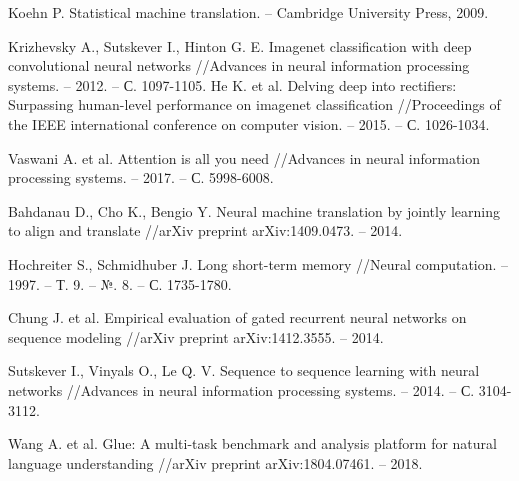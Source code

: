 \begingroup 
\renewcommand{\section}[2]{\anonsection{Список используемых источников}}
\begin{thebibliography}{00}

    Koehn P. Statistical machine translation. – Cambridge University Press, 2009.
    
    Krizhevsky A., Sutskever I., Hinton G. E. Imagenet classification with deep convolutional neural networks //Advances in neural information processing systems. – 2012. – С. 1097-1105.
    He K. et al. Delving deep into rectifiers: Surpassing human-level performance on imagenet classification //Proceedings of the IEEE international conference on computer vision. – 2015. – С. 1026-1034.
    
    Vaswani A. et al. Attention is all you need //Advances in neural information processing systems. – 2017. – С. 5998-6008.
    
    Bahdanau D., Cho K., Bengio Y. Neural machine translation by jointly learning to align and translate //arXiv preprint arXiv:1409.0473. – 2014.
    
    Hochreiter S., Schmidhuber J. Long short-term memory //Neural computation. – 1997. – Т. 9. – №. 8. – С. 1735-1780.
    
    Chung J. et al. Empirical evaluation of gated recurrent neural networks on sequence modeling //arXiv preprint arXiv:1412.3555. – 2014.
    
    Sutskever I., Vinyals O., Le Q. V. Sequence to sequence learning with neural networks //Advances in neural information processing systems. – 2014. – С. 3104-3112.
    
    Wang A. et al. Glue: A multi-task benchmark and analysis platform for natural language understanding //arXiv preprint arXiv:1804.07461. – 2018.

\end{thebibliography}
\endgroup

\clearpage
